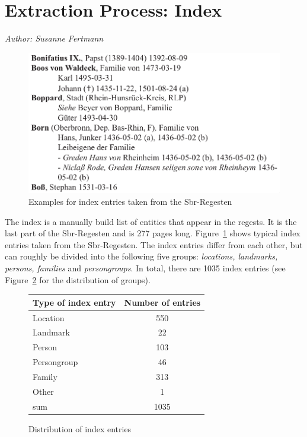 \section{Extraction Process: Index}
\label{sec:index}

\emph{Author: Susanne Fertmann} \\

\begin{figure}[h]
  \centering
  \includegraphics[scale=0.3]{img/index-examples}
  \caption{Examples for index entries taken from the Sbr-Regesten}
  \label{fig:index-examples}
\end{figure}

The index is a manually build list of entities that appear in the
regests. It is the last part of the Sbr-Regesten and is 277 pages
long. Figure~\ref{fig:index-examples} shows typical index entries
taken from the Sbr-Regesten. The index entries differ from each other,
but can roughly be divided into the following five groups:
\textit{locations, landmarks, persons, families} and
\textit{persongroups}. In total, there are 1035 index entries (see
Figure~\ref{fig:type-table} for the distribution of groups).

\begin{figure}[h]
\centering
\begin{tabular}{|l|c|}
\hline
Type of index entry & Number of entries  \\
\hline
Location            & 550 \\
Landmark            & 22  \\
Person              & 103 \\
Persongroup         & 46  \\
Family              & 313 \\
Other               & 1   \\
\hline
sum         & 1035\\
\hline
\end{tabular}
\caption{Distribution of index entries}
\label{fig:type-table}
\end{figure}

